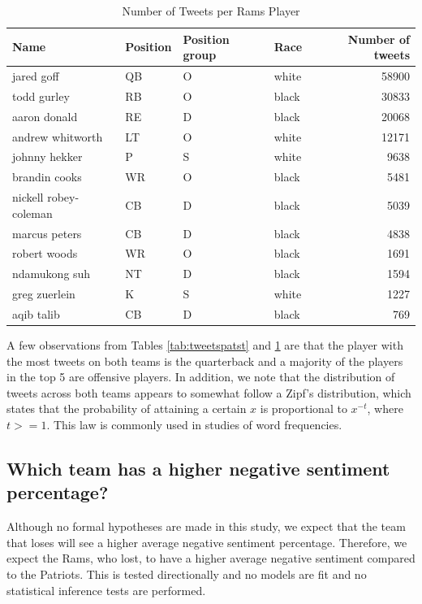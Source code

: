 \documentclass[12pt,twoside]{reedthesis}
\begin{document}
\small
\begin{table}[!h]

\caption[Number of Tweets per Rams Player]{\label{tab:tweetsramst}Number of Tweets per Rams Player}
\centering
\begin{tabular}{l|l|l|l|r}
\hline
Name & Position & Position group & Race & Number of tweets\\
\hline
jared goff & QB & O & white & 58900\\
\hline
todd gurley & RB & O & black & 30833\\
\hline
aaron donald & RE & D & black & 20068\\
\hline
andrew whitworth & LT & O & white & 12171\\
\hline
johnny hekker & P & S & white & 9638\\
\hline
brandin cooks & WR & O & black & 5481\\
\hline
nickell robey-coleman & CB & D & black & 5039\\
\hline
marcus peters & CB & D & black & 4838\\
\hline
robert woods & WR & O & black & 1691\\
\hline
ndamukong suh & NT & D & black & 1594\\
\hline
greg zuerlein & K & S & white & 1227\\
\hline
aqib talib & CB & D & black & 769\\
\hline
\end{tabular}
\end{table}
\normalsize

A few observations from Tables \ref{tab:tweetspatst} and
\ref{tab:tweetsramst} are that the player with the most tweets on both
teams is the quarterback and a majority of the players in the top 5 are
offensive players. In addition, we note that the distribution of tweets
across both teams appears to somewhat follow a Zipf's distribution,
which states that the probability of attaining a certain \(x\) is
proportional to \(x^{-t}\), where \(t >= 1\). This law is commonly used
in studies of word frequencies.

\subsection{Which team has a higher negative sentiment
percentage?}\label{which-team-has-a-higher-negative-sentiment-percentage}

Although no formal hypotheses are made in this study, we expect that the
team that loses will see a higher average negative sentiment percentage.
Therefore, we expect the Rams, who lost, to have a higher average
negative sentiment compared to the Patriots. This is tested
directionally and no models are fit and no statistical inference tests
are performed.
\end{document}
